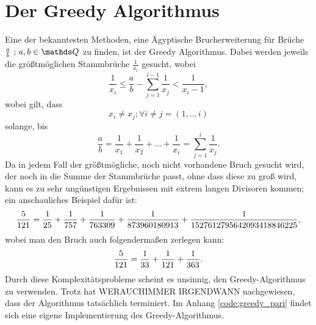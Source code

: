 \section{Der Greedy Algorithmus}
Eine der bekanntesten Methoden, eine Ägyptische  Brucherweiterung
für Brüche $\frac{a}{b} \text{ ; } a, b \in \Q$ zu finden, ist der Greedy Algorithmus. Dabei werden jeweils die größtmöglichen Stammbrüche $\frac{1}{x_i}$ gesucht, wobei
$$\frac{1}{x_i} \leq \frac{a}{b} - \sum_{j=1}^{i-1} \frac{1}{x_j} < \frac{1}{x_{i}-1},$$
wobei gilt, dass
$$x_i \neq x_j; \forall i \neq j = (1,..,i)$$ 
solange, bis
$$\frac{a}{b} = \frac{1}{x_1} + \frac{1}{x_2} + ... + \frac{1}{x_i} = \sum_{j=1}^{i} \frac{1}{x_j}.$$
Da in jedem Fall der größtmögliche, noch nicht vorhandene Bruch gesucht wird, der noch in die Summe der Stammbrüche passt, ohne dass diese zu groß wird, kann es zu sehr ungünstigen Ergebnissen mit extrem langen Divisoren kommen; ein anschauliches Beispiel dafür ist:
$$\frac{5}{121} = \frac{1}{25} + \frac{1}{757} + \frac{1}{763309} + \frac{1}{873960180913} + \frac{1}{1527612795642093418846225},$$
wobei man den Bruch auch folgendermaßen zerlegen kann:
$$\frac{5}{121} = \frac{1}{33} + \frac{1}{121} + \frac{1}{363}.$$
Durch diese Komplexitätsprobleme scheint es unsinnig, den Greedy-Algorithmus zu verwenden. Trotz hat WERAUCHIMMER 
IRGENDWANN  nachgewiesen, dass der Algorithmus tatsächlich terminiert.
Im Anhang \ref{code:greedy_pari} findet sich eine eigene Implementierung des Greedy-Algorithmus.
